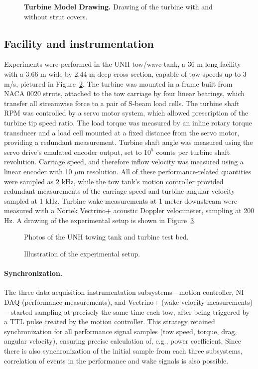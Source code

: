 \documentclass[10pt,letterpaper]{article}
\begin{document}
\begin{figure}[h]
\caption{{\bf Turbine Model Drawing.}
Drawing of the turbine with and without strut covers.}
\label{fig:turbine-drawing}
\end{figure}


\subsection*{Facility and instrumentation}

Experiments were performed in the UNH tow/wave tank, a 36 m long facility with a
3.66 m wide by 2.44 m deep cross-section, capable of tow speeds up to 3 m/s,
pictured in Figure~\ref{fig:tow-tank}. The turbine was mounted in a frame built
from NACA 0020 struts, attached to the tow carriage by four linear bearings,
which transfer all streamwise force to a pair of S-beam load cells. The turbine
shaft RPM was controlled by a servo motor system, which allowed prescription of
the turbine tip speed ratio. The load torque was measured by an inline rotary
torque transducer and a load cell mounted at a fixed distance from the servo
motor, providing a redundant measurement. Turbine shaft angle was measured using
the servo drive's emulated encoder output, set to $10^5$ counts per turbine
shaft revolution. Carriage speed, and therefore inflow velocity was measured
using a linear encoder with 10 $\mu$m resolution. All of these
performance-related quantities were sampled as 2 kHz, while the tow tank's
motion controller provided redundant measurements of the carriage speed and
turbine angular velocity sampled at 1 kHz. Turbine wake measurements at 1 meter
downstream were measured with a Nortek Vectrino+ acoustic Doppler velocimeter,
sampling at 200 Hz. A drawing of the experimental setup is shown in
Figure~\ref{fig:exp-setup}.


\begin{figure}[h]
\caption{Photos of the UNH towing tank and turbine test bed.} 
\label{fig:tow-tank}
\end{figure}

\begin{figure}[h]
\centering
\caption{Illustration of the experimental setup.}
\label{fig:exp-setup}
\end{figure}

\paragraph{Synchronization.} The three data acquisition instrumentation
subsystems---motion controller, NI DAQ (performance measurements), and Vectrino+
(wake velocity measurements)---started sampling at precisely the same time each
tow, after being triggered by a TTL pulse created by the motion controller. This
strategy retained synchronization for all performance signal samples (tow speed,
torque, drag, angular velocity), ensuring precise calculation of, e.g., power
coefficient. Since there is also synchronization of the initial sample from each
three subsystems, correlation of events in the performance and wake signals is
also possible.
\end{document}
